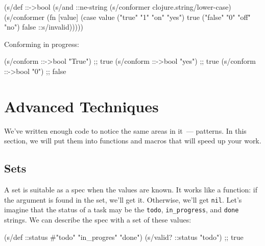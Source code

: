 \else

\begin{english}
  \begin{clojure}
(s/def ::->bool
  (s/and
   ::ne-string
   (s/conformer clojure.string/lower-case)
   (s/conformer
    (fn [value]
      (case value
        ("true" "1" "on" "yes") true
        ("false" "0" "off" "no") false
        ::s/invalid)))))

  \end{clojure}
\end{english}

\fi

\noindent
Conforming in progress:

\begin{english}
  \begin{clojure}
(s/conform ::->bool "True") ;; true
(s/conform ::->bool "yes")  ;; true
(s/conform ::->bool "0")    ;; false
  \end{clojure}
\end{english}

\section{Advanced Techniques}


We've written enough code to notice the same areas in it~--- patterns. In this section, we will put them into functions and macros that will speed up your work.

\subsection{Sets}


A set is suitable as a spec when the values are known. It works like a function: if the argument is found in the set, we'll get it. Otherwise, we'll get \verb|nil|. Let's imagine that the status of a task may be the \verb|todo|, \verb|in_progress|, and \verb|done| strings. We can describe the spec with a set of these values:

\ifx\DEVICETYPE\MOBILE

\begin{english}
  \begin{clojure}
(s/def ::status
  #{"todo" "in_progres" "done"})
(s/valid? ::status "todo") ;; true
  \end{clojure}
\end{english}

